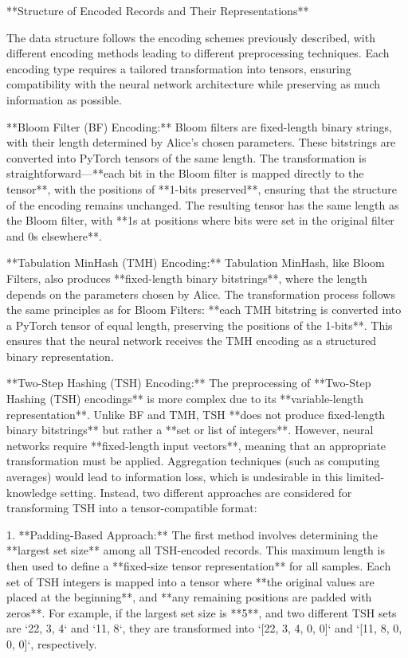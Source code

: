  **Structure of Encoded Records and Their Representations**

The data structure follows the encoding schemes previously described, with different encoding methods leading to different preprocessing techniques. Each encoding type requires a tailored transformation into tensors, ensuring compatibility with the neural network architecture while preserving as much information as possible.

**Bloom Filter (BF) Encoding:**
Bloom filters are fixed-length binary strings, with their length determined by Alice’s chosen parameters. These bitstrings are converted into PyTorch tensors of the same length. The transformation is straightforward—**each bit in the Bloom filter is mapped directly to the tensor**, with the positions of **1-bits preserved**, ensuring that the structure of the encoding remains unchanged. The resulting tensor has the same length as the Bloom filter, with **1s at positions where bits were set in the original filter and 0s elsewhere**.

**Tabulation MinHash (TMH) Encoding:**
Tabulation MinHash, like Bloom Filters, also produces **fixed-length binary bitstrings**, where the length depends on the parameters chosen by Alice. The transformation process follows the same principles as for Bloom Filters: **each TMH bitstring is converted into a PyTorch tensor of equal length, preserving the positions of the 1-bits**. This ensures that the neural network receives the TMH encoding as a structured binary representation.

**Two-Step Hashing (TSH) Encoding:**
The preprocessing of **Two-Step Hashing (TSH) encodings** is more complex due to its **variable-length representation**. Unlike BF and TMH, TSH **does not produce fixed-length binary bitstrings** but rather a **set or list of integers**. However, neural networks require **fixed-length input vectors**, meaning that an appropriate transformation must be applied. Aggregation techniques (such as computing averages) would lead to information loss, which is undesirable in this limited-knowledge setting. Instead, two different approaches are considered for transforming TSH into a tensor-compatible format:

1. **Padding-Based Approach:**
   The first method involves determining the **largest set size** among all TSH-encoded records. This maximum length is then used to define a **fixed-size tensor representation** for all samples. Each set of TSH integers is mapped into a tensor where **the original values are placed at the beginning**, and **any remaining positions are padded with zeros**. For example, if the largest set size is **5**, and two different TSH sets are `{22, 3, 4}` and `{11, 8}`, they are transformed into `[22, 3, 4, 0, 0]` and `[11, 8, 0, 0, 0]`, respectively.

